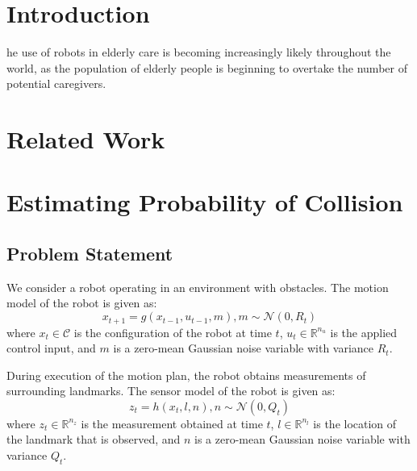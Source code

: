 \documentclass[journal]{IEEEtran}
\begin{document}
\section{Introduction}
% 
% 
% 
% 
he use of robots in elderly care is becoming increasingly likely throughout the world, as the population of elderly people is beginning to overtake the number of potential caregivers. 

\section{Related Work}

\section{Estimating Probability of Collision}
\subsection{Problem Statement}
We consider a robot operating in an environment with obstacles.%
The motion model of the robot is given as:
$$x_{t+1} = g(x_{t-1}, u_{t-1}, m), m \sim \mathcal{N}(0,R_t)$$
where $x_t \in \mathcal{C}$ is the configuration of the robot at time $t$, $u_t \in\mathbb{R}^{n_u}$ is the applied control input, and $m$ is a zero-mean Gaussian noise variable with variance $R_t$.

During execution of the motion plan, the robot obtains measurements of surrounding landmarks. The sensor model of the robot is given as:
$$z_t = h(x_t,l,n), n \sim \mathcal{N}(0,Q_t)$$
where $z_t \in \mathbb{R}^{n_z}$ is the measurement obtained at time $t$, $l \in \mathbb{R}^{n_l}$ is the location of the landmark that is observed, and $n$ is a zero-mean Gaussian noise variable with variance $Q_t$.
\end{document}
